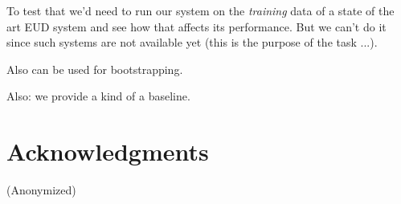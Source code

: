 \documentclass[11pt,a4paper]{article}
\begin{document}
To test that we'd need to run our system on the \emph{training} data
of a state of the art EUD system and see how that affects its
performance. But we can't do it since such systems are not available
yet (this is the purpose of the task ...).

Also can be used for bootstrapping.

Also: we provide a kind of a baseline.

\section*{Acknowledgments}

(Anonymized)



\end{document}
